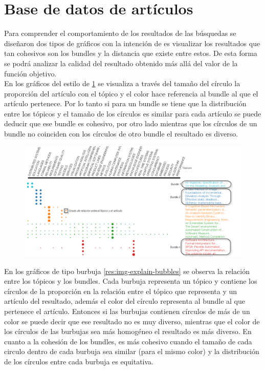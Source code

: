 \section{Base de datos de artículos}
Para comprender el comportamiento de los resultados de las búsquedas se diseñaron dos tipos de gráficos con la intención de es visualizar los resultados que tan cohesivos son los bundles y la distancia que existe entre estos. De esta forma se podrá analizar la calidad del resultado obtenido más allá del valor de la función objetivo.\\
En los gráficos del estilo de \ref{res:img-explain-bars} se visualiza a través del tamaño del círculo la proporción del artículo con el tópico y el color hace referencia al bundle al que el artículo pertenece. Por lo tanto si para un bundle se tiene que la distribución entre los tópicos y el tamaño de los círculos es similar para cada artículo se puede deducir que ese bundle es cohesivo, por otro lado mientras que los círculos de un bundle no coinciden con los círculos de otro bundle el resultado es diverso.
\begin{figure}[H]
  \centering
    \includegraphics[width=1\textwidth]{img/explain-bars.png}
  \caption{}
  \label{res:img-explain-bars}
\end{figure}

En los gráficos de tipo burbuja \ref{res:img-explain-bubbles} se observa la relación entre los tópicos y los bundles. Cada burbuja representa un tópico y contiene los círculos de la proporción en la relación entre el tópico que representa y un artículo del resultado, además el color del círculo representa al bundle al que pertenece el artículo. Entonces si las burbujas contienen círculos de más de un color se puede decir que ese resultado no es muy diverso, mientras que el color de los círculos de las burbujas sea más homogéneo el resultado es más diverso. En cuanto a la cohesión de los bundles, es más cohesivo cuando el tamaño de cada circulo dentro de cada burbuja sea similar (para el mismo color) y la distribución de los círculos entre cada burbuja es equitativa.

